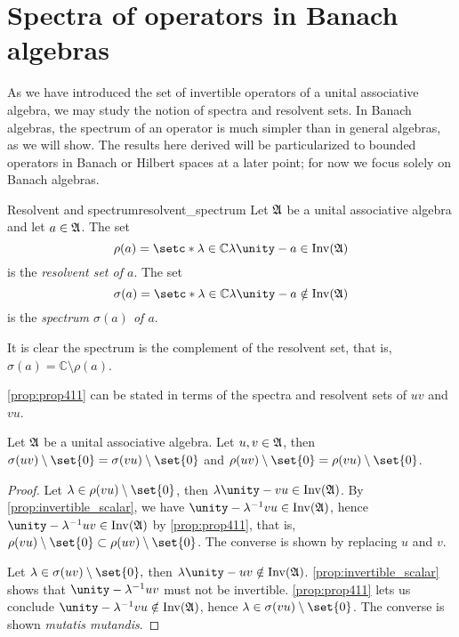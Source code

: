 \section{Spectra of operators in Banach algebras}
As we have introduced the set of invertible operators of a unital associative algebra, we may study the notion of spectra and resolvent sets. In Banach algebras, the spectrum of an operator is much simpler than in general algebras, as we will show. The results here derived will be particularized to bounded operators in Banach or Hilbert spaces at a later point; for now we focus solely on Banach algebras.
\begin{definition}{Resolvent and spectrum}{resolvent_spectrum}
    Let \(\mathfrak{A}\) be a unital associative algebra and let \(a \in \mathfrak{A}\). The set
    \begin{equation*}
        \rho(a) = \setc*{\lambda \in \mathbb{C}}{\lambda \unity - a \in \invertible{\algebra{A}}}
    \end{equation*}
    is the \emph{resolvent set of \(a\)}.  The set
    \begin{equation*}
        \sigma(a) = \setc*{\lambda \in \mathbb{C}}{\lambda \unity - a \notin \invertible{\algebra{A}}}
    \end{equation*}
    is the \emph{spectrum \(\sigma(a)\) of \(a\)}.
\end{definition}
\begin{remark}
    It is clear the spectrum is the complement of the resolvent set, that is, \(\sigma(a) = \mathbb{C} \setminus \rho(a)\).
\end{remark}

\cref{prop:prop411} can be stated in terms of the spectra and resolvent sets of \(uv\) and \(vu\).
\begin{corollary}
    Let \(\mathfrak{A}\) be a unital associative algebra. Let \(u, v \in \mathfrak{A}\), then \(\sigma(uv) \setminus \set{0} = \sigma(vu) \setminus\set{0}\) and \(\rho(uv)\setminus\set{0} = \rho(vu)\setminus\set{0}\).
\end{corollary}
\begin{proof}
    Let \(\lambda \in \rho(vu)\setminus\set{0}\), then \(\lambda \unity - vu \in \invertible{\algebra{A}}\). By \cref{prop:invertible_scalar}, we have \(\unity - \lambda^{-1} vu \in \invertible{\algebra{A}}\), hence \( \unity - \lambda^{-1} uv \in \invertible{\algebra{A}}\) by \cref{prop:prop411}, that is, \(\rho(vu) \setminus \set{0} \subset \rho(uv)\setminus \set{0}\). The converse is shown by replacing \(u\) and \(v\).

    Let \(\lambda \in \sigma(uv) \setminus \set{0},\) then \(\lambda \unity - uv \notin \invertible{\algebra{A}}\). \cref{prop:invertible_scalar} shows that \(\unity - \lambda^{-1} uv\) must not be invertible. \cref{prop:prop411} lets us conclude \(\unity - \lambda^{-1} vu \notin \invertible{\algebra{A}}\), hence \(\lambda \in \sigma(vu) \setminus\set{0}\). The converse is shown \emph{mutatis mutandis}.
\end{proof}

